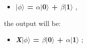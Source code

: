 \documentclass[conference]{IEEEtran}
\begin{document}
\begin{itemize}
\begin{itemize}
        \vspace{4pt}
        
        \begin{itemize}
            \item 
            \begin{center}
                \textbf{
                    $\mid$$\phi$$\rangle$ = $\alpha$$\mid$0$\rangle$ + $\beta$$\mid$1$\rangle$
                },
            \end{center}
        \end{itemize}
        
        \vspace{4pt}
        
        the output will be:
        
        \vspace{4pt}
        
        \begin{itemize}
            \item 
            \begin{center}
            \textbf{
                \textit{X}$\mid$$\phi$$\rangle$ = $\beta$$\mid$0$\rangle$ + $\alpha$$\mid$1$\rangle$
            };
            \end{center}
        \end{itemize}
        
        \vspace{4pt}
        

\end{itemize}
\end{itemize}
\end{document}
